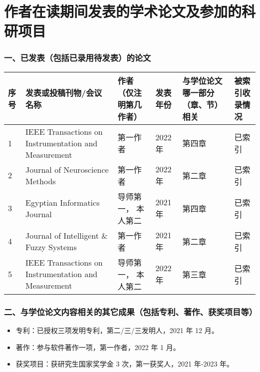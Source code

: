 
\chapter*{作者在读期间发表的学术论文及参加的科研项目}

\subsection*{一、已发表（包括已录用待发表）的论文}

\begin{longtable}{|p{0.6cm}|p{6cm}|p{2.2cm}|p{2cm}|p{2cm}|p{2cm}|}
  \hline
    序号 & 
    发表或投稿刊物/会议名称 & 
    作者（仅注明第几作者）& 
    发表年份 & 
    与学位论文哪一部分（章、节）相关 & 
    被索引收录情况 \\
  \hline
  1 & IEEE Transactions on Instrumentation and Measurement & 第一作者 & 2022 年 & 第四章 & 已索引 \\
  \hline
  2 & Journal of Neuroscience Methods & 第一作者 & 2022 年 & 第二章 & 已索引 \\
  \hline
  3 & Egyptian Informatics Journal & 导师第一， 本人第二 & 2021 年 & 第四章 & 已索引 \\
  \hline
  4 & Journal of Intelligent \& Fuzzy Systems & 第一作者 & 2021 年 & 第二章 & 已索引 \\
  \hline
  5 & IEEE Transactions on Instrumentation and Measurement & 导师第一， 本人第二 & 2022 年 & 第三章 & 已索引 \\
  \hline
\end{longtable}

\subsection*{二、与学位论文内容相关的其它成果（包括专利、著作、获奖项目等）}

\begin{itemize}
    \item[] 专利：已授权三项发明专利，第二/三/三发明人，2021 年 12 月。
    \item[] 著作：参与软件著作一项，第一作者，2022 年 1 月。
    \item[] 获奖项目：获研究生国家奖学金 3 次，第一获奖人，2021 年-2023 年。
\end{itemize}